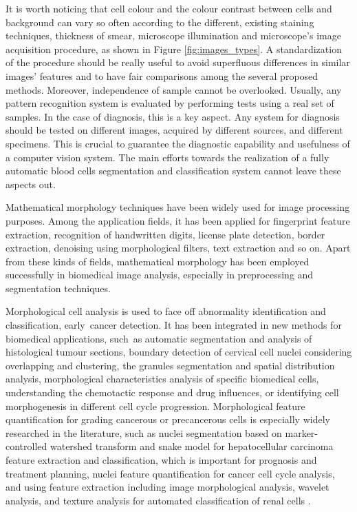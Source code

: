 \documentclass[sensors,review,accept,moreauthors,pdftex,10pt,a4paper]{mdpi}
\begin{document}
It is worth noticing that cell colour and the colour contrast between cells and background can vary so often according to the different, existing staining techniques, thickness of smear, microscope illumination and microscope's image acquisition procedure, as shown in Figure  \ref{fig:images_types}. A standardization of the procedure should be really useful to avoid superfluous differences in similar images' features and to have fair comparisons among the several proposed methods.  Moreover, independence of sample cannot be overlooked. Usually, any  pattern recognition system is evaluated by performing tests using a real set of samples. In the case of diagnosis, this is a key aspect. Any system for diagnosis should be tested on different images, acquired by different sources, and different specimens. This is crucial to guarantee the diagnostic capability and usefulness of a computer vision system. The main efforts towards the realization of a fully automatic blood cells segmentation and classification system cannot leave these aspects out.

Mathematical morphology techniques have been widely used for image processing purposes. Among the application fields, it has been applied for fingerprint feature extraction, recognition of handwritten digits, license plate detection, border extraction, denoising using morphological filters, text extraction and so on. Apart from these kinds of fields, mathematical morphology has been employed successfully in biomedical image analysis, especially in preprocessing and segmentation techniques.

Morphological cell analysis is used to face off abnormality identification and classification, early~cancer detection. It has been integrated in new methods for biomedical applications, such~as automatic segmentation and analysis of histological tumour sections, boundary detection of cervical cell nuclei considering overlapping and clustering, the granules segmentation and spatial distribution analysis, morphological characteristics analysis of specific biomedical cells, understanding the chemotactic response and drug influences, or identifying cell morphogenesis in different cell cycle progression.
Morphological feature quantification for grading cancerous or precancerous cells is especially widely researched in the literature, such as nuclei segmentation based on marker-controlled watershed transform and snake model for hepatocellular carcinoma feature extraction and classification, which is important for prognosis and treatment planning, nuclei feature quantification for cancer cell cycle analysis, and using feature extraction including image morphological analysis, wavelet analysis, and texture analysis for automated classification of renal cells \cite{Chen2012}.
\end{document}
